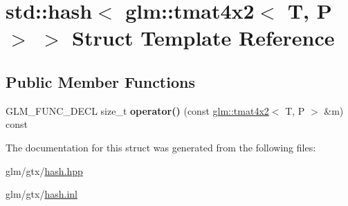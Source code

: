 \hypertarget{structstd_1_1hash_3_01glm_1_1tmat4x2_3_01T_00_01P_01_4_01_4}{\section{std\-:\-:hash$<$ glm\-:\-:tmat4x2$<$ T, P $>$ $>$ Struct Template Reference}
\label{structstd_1_1hash_3_01glm_1_1tmat4x2_3_01T_00_01P_01_4_01_4}
}
\subsection*{Public Member Functions}
\begin{DoxyCompactItemize}
\item 
\hypertarget{structstd_1_1hash_3_01glm_1_1tmat4x2_3_01T_00_01P_01_4_01_4_acf5a37dff6ad08a8a2131231b170fe39}{G\-L\-M\-\_\-\-F\-U\-N\-C\-\_\-\-D\-E\-C\-L size\-\_\-t {\bfseries operator()} (const \hyperlink{structglm_1_1tmat4x2}{glm\-::tmat4x2}$<$ T, P $>$ \&m) const }\label{structstd_1_1hash_3_01glm_1_1tmat4x2_3_01T_00_01P_01_4_01_4_acf5a37dff6ad08a8a2131231b170fe39}

\end{DoxyCompactItemize}


The documentation for this struct was generated from the following files\-:\begin{DoxyCompactItemize}
\item 
glm/gtx/\hyperlink{hash_8hpp}{hash.\-hpp}\item 
glm/gtx/\hyperlink{hash_8inl}{hash.\-inl}\end{DoxyCompactItemize}
